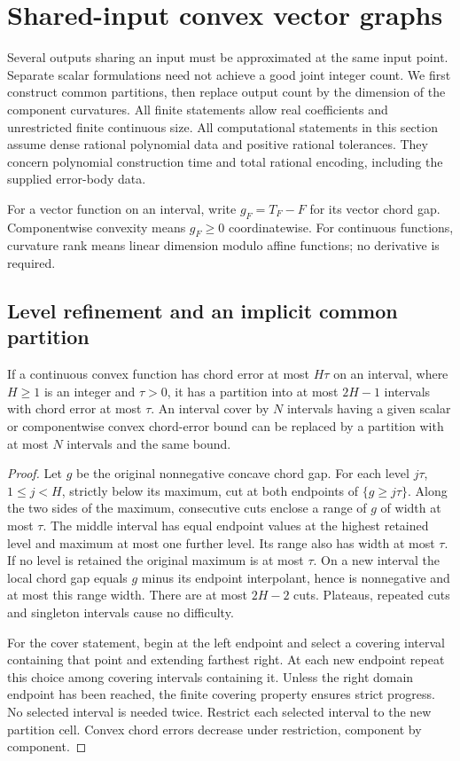 \section{Shared-input convex vector graphs}\label{sec:vector}

Several outputs sharing an input must be approximated at the same input
point. Separate scalar formulations need not achieve a good joint integer
count. We first construct common partitions, then replace output count by
the dimension of the component curvatures. All finite statements allow
real coefficients and unrestricted finite continuous size. All computational
statements in this section assume dense rational polynomial data and
positive rational tolerances. They concern polynomial construction time
and total rational encoding, including the supplied error-body data.

For a vector function on an interval, write $g_F=T_F-F$ for its vector
chord gap. Componentwise convexity means $g_F\ge0$ coordinatewise.
For continuous functions, curvature rank means linear dimension modulo
affine functions; no derivative is required.

\subsection{Level refinement and an implicit common partition}

\begin{lemma}\label{lem:level-refinement}
If a continuous convex function has chord error at most $H\tau$ on an
interval, where $H\ge1$ is an integer and $\tau>0$, it has a partition
into at most $2H-1$ intervals with chord error at most $\tau$.
An interval cover by $N$ intervals having a given scalar or componentwise
convex chord-error bound can be replaced by a partition with at most
$N$ intervals and the same bound.
\end{lemma}
\begin{proof}
Let $g$ be the original nonnegative concave chord gap. For each level
$j\tau$, $1\le j<H$, strictly below its maximum, cut at both endpoints
of $\{g\ge j\tau\}$. Along the two sides of the maximum, consecutive
cuts enclose a range of $g$ of width at most $\tau$. The middle interval
has equal endpoint values at the highest retained level and maximum
at most one further level. Its range also has width at most $\tau$.
If no level is retained the original maximum is at most $\tau$.
On a new interval the local chord gap equals $g$ minus its endpoint
interpolant, hence is nonnegative and at most this range width.
There are at most $2H-2$ cuts. Plateaus, repeated cuts and singleton
intervals cause no difficulty.

For the cover statement, begin at the left endpoint and select a covering
interval containing that point and extending farthest right. At each new
endpoint repeat this choice among covering intervals containing it.
Unless the right domain endpoint has been reached, the finite covering
property ensures strict progress. No selected interval is needed twice.
Restrict each selected interval to the new partition cell. Convex chord
errors decrease under restriction, component by component.
\end{proof}

